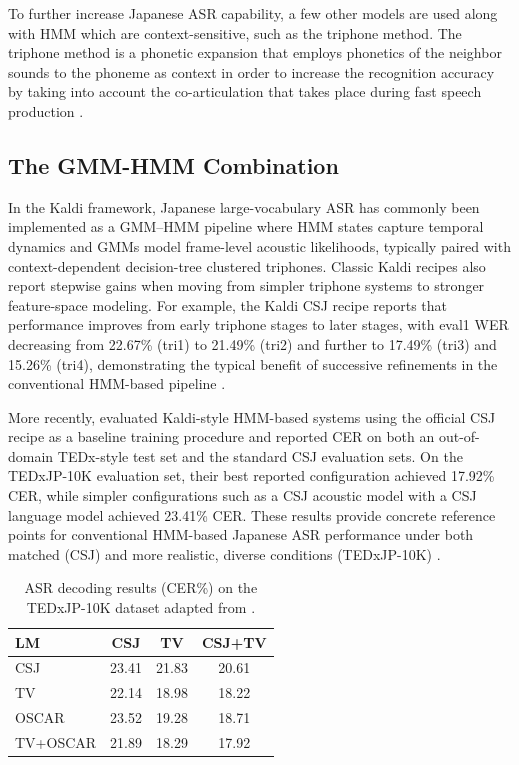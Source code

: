To further increase Japanese ASR capability, a few other models are used along with HMM which are context-sensitive, such as the triphone method. The triphone method is a phonetic expansion that employs phonetics of the neighbor sounds to the phoneme as context in order to increase the recognition accuracy by taking into account the co-articulation that takes place during fast speech production \parencite{Tokuda2000HMM}.

\subsection{The GMM-HMM Combination}
In the Kaldi framework, Japanese large-vocabulary ASR has commonly been implemented as a GMM--HMM pipeline where HMM states capture temporal dynamics and GMMs model frame-level acoustic likelihoods, typically paired with context-dependent decision-tree clustered triphones. Classic Kaldi recipes also report stepwise gains when moving from simpler triphone systems to stronger feature-space modeling. For example, the Kaldi CSJ recipe reports that performance improves from early triphone stages to later stages, with eval1 WER decreasing from 22.67\% (tri1) to 21.49\% (tri2) and further to 17.49\% (tri3) and 15.26\% (tri4), demonstrating the typical benefit of successive refinements in the conventional HMM-based pipeline \parencite{KaldiCSJResults2015}.

More recently, \textcite{ando2021} evaluated Kaldi-style HMM-based systems using the official CSJ recipe as a baseline training procedure and reported CER on both an out-of-domain TEDx-style test set and the standard CSJ evaluation sets. On the TEDxJP-10K evaluation set, their best reported configuration achieved 17.92\% CER, while simpler configurations such as a CSJ acoustic model with a CSJ language model achieved 23.41\% CER. These results provide concrete reference points for conventional HMM-based Japanese ASR performance under both matched (CSJ) and more realistic, diverse conditions (TEDxJP-10K) \parencite{ando2021}.

\begin{table}[H]
\centering
\caption{ASR decoding results (CER\%) on the TEDxJP-10K dataset adapted from \cite{ando2021}.}
\label{tab:tedxjp10k_cer}
{\small
\setlength{\tabcolsep}{8pt}
\renewcommand{\arraystretch}{1.2}
\begin{tabular}{lccc}
\hline
\textbf{LM} & \textbf{CSJ} & \textbf{TV} & \textbf{CSJ+TV} \\
\hline
CSJ        & 23.41 & 21.83 & 20.61 \\
TV         & 22.14 & 18.98 & 18.22 \\
OSCAR      & 23.52 & 19.28 & 18.71 \\
TV+OSCAR   & 21.89 & 18.29 & 17.92 \\
\hline
\end{tabular}}
\end{table}

